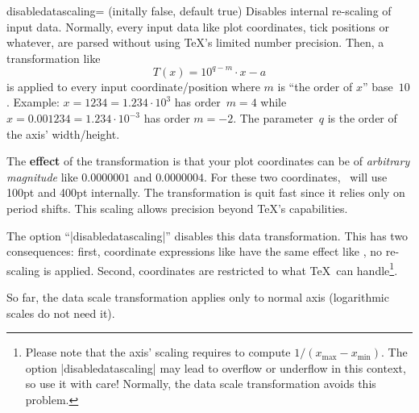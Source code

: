 \label{sec:disabledatascaling}%
\begin{pgfplotskey}{disabledatascaling= (initally false, default true)}
%
%
Disables internal re-scaling of input data. Normally, every input data like plot coordinates, tick positions or whatever, are parsed without using \TeX's limited number precision. Then, a transformation like 
	\[ T(x) = 10^{q-m} \cdot x - a \]
is applied to every input coordinate/position where $m$ is ``the order of $x$'' base~$10$. Example: $x=1234 = 1.234\cdot 10^3$ has order~$m=4$ while $x=0.001234 = 1.234\cdot 10^{-3}$ has order $m=-2$. The parameter~$q$ is the order of the axis' width/height.

The \textbf{effect} of the transformation is that your plot coordinates can be of \emph{arbitrary magnitude} like $0.0000001$ and $0.0000004$. For these two coordinates, \PGFPlots\ will use 100pt and 400pt internally. The transformation is quit fast since it relies only on period shifts. This scaling allows precision beyond \TeX's capabilities.

The option ``|disabledatascaling|'' disables this data transformation. This has two consequences: first, coordinate expressions like  have the same effect like , no re-scaling is applied. Second, coordinates are restricted to what \TeX\ can handle\footnote{Please note that the axis' scaling requires to compute $1/( x_\text{max} - x_{\text{min}} )$. The option |disabledatascaling| may lead to overflow or underflow in this context, so use it with care! Normally, the data scale transformation avoids this problem.}.

So far, the data scale transformation applies only to normal axis (logarithmic scales do not need it). 
\end{pgfplotskey}



